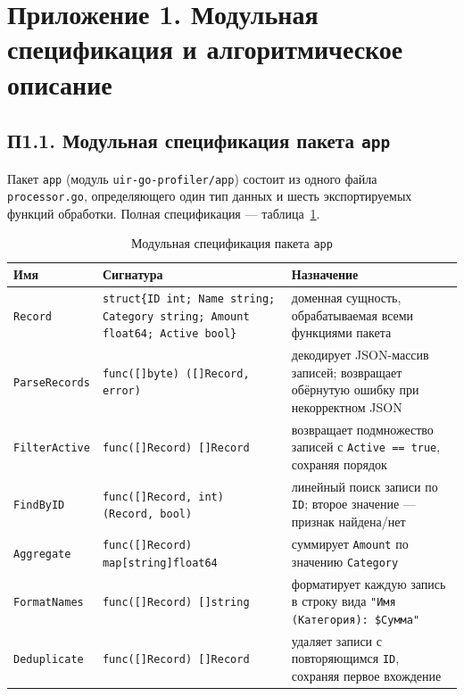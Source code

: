 \section*{Приложение 1. Модульная спецификация и алгоритмическое описание}
\renewcommand{\thetable}{П1.\arabic{table}}
\setcounter{table}{0}

\subsection*{П1.1. Модульная спецификация пакета \texttt{app}}

Пакет \texttt{app} (модуль \texttt{uir-go-profiler/\allowbreak app}) состоит из одного
файла \texttt{processor.go}, определяющего один тип данных и шесть
экспортируемых функций обработки. Полная спецификация — таблица~\ref{tab:p1.1}.

\begin{table}[htbp]
\caption{Модульная спецификация пакета \texttt{app}}
\label{tab:p1.1}
\centering
\begin{tabular}{p{3.1cm}p{6.6cm}p{4.3cm}}
\toprule
Имя & Сигнатура & Назначение \\
\midrule
\texttt{Record} & \texttt{struct\{ID int; Name string; Category string; Amount float64; Active bool\}} & доменная сущность, обрабатываемая всеми функциями пакета \\
\texttt{ParseRecords} & \texttt{func([]byte) ([]Record, error)} & декодирует JSON-массив записей; возвращает обёрнутую ошибку при некорректном JSON \\
\texttt{FilterActive} & \texttt{func([]Record) []Record} & возвращает подмножество записей с \texttt{Active == true}, сохраняя порядок \\
\texttt{FindByID} & \texttt{func([]Record, int) (Record, bool)} & линейный поиск записи по \texttt{ID}; второе значение — признак найдена/нет \\
\texttt{Aggregate} & \texttt{func([]Record) map[string]float64} & суммирует \texttt{Amount} по значению \texttt{Category} \\
\texttt{FormatNames} & \texttt{func([]Record) []string} & форматирует каждую запись в строку вида \texttt{"Имя (Категория): \$Сумма"} \\
\texttt{Deduplicate} & \texttt{func([]Record) []Record} & удаляет записи с повторяющимся \texttt{ID}, сохраняя первое вхождение \\
\bottomrule
\end{tabular}
\end{table}

